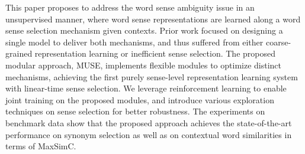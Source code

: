 This paper proposes to address the word sense ambiguity issue in an unsupervised manner, where word sense representations are learned along a word sense selection mechanism given contexts. Prior work focused on designing a single model to deliver both mechanisms, and thus suffered from either coarse-grained representation learning or inefficient sense selection. The proposed modular approach, MUSE, implements flexible modules to optimize distinct mechanisms, achieving the first purely sense-level representation learning system with linear-time sense selection. We leverage reinforcement learning to enable joint training on the proposed modules, and introduce various exploration techniques on sense selection for better robustness. The experiments on benchmark data show that the proposed approach achieves the state-of-the-art performance on synonym selection as well as on contextual word similarities in terms of MaxSimC.
